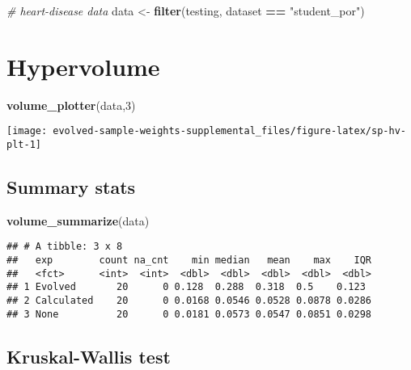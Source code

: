 \documentclass[
]{book}
\newenvironment{Shaded}{\begin{snugshade}}{\end{snugshade}}
\newcommand{\CommentTok}[1]{\textcolor[rgb]{0.56,0.35,0.01}{\textit{#1}}}
\newcommand{\DecValTok}[1]{\textcolor[rgb]{0.00,0.00,0.81}{#1}}
\newcommand{\FunctionTok}[1]{\textcolor[rgb]{0.13,0.29,0.53}{\textbf{#1}}}
\newcommand{\NormalTok}[1]{#1}
\newcommand{\OtherTok}[1]{\textcolor[rgb]{0.56,0.35,0.01}{#1}}
\newcommand{\SpecialCharTok}[1]{\textcolor[rgb]{0.81,0.36,0.00}{\textbf{#1}}}
\newcommand{\StringTok}[1]{\textcolor[rgb]{0.31,0.60,0.02}{#1}}
\begin{document}
\begin{Shaded}
\begin{Highlighting}[]
\CommentTok{\# heart{-}disease data}
\NormalTok{data }\OtherTok{\textless{}{-}} \FunctionTok{filter}\NormalTok{(testing, dataset }\SpecialCharTok{==} \StringTok{"student\_por"}\NormalTok{)}
\end{Highlighting}
\end{Shaded}

\hypertarget{hypervolume-2}{%
\section{Hypervolume}\label{hypervolume-2}}

\begin{Shaded}
\begin{Highlighting}[]
\FunctionTok{volume\_plotter}\NormalTok{(data,}\DecValTok{3}\NormalTok{)}
\end{Highlighting}
\end{Shaded}

\texttt{[image: evolved-sample-weights-supplemental\_files/figure-latex/sp-hv-plt-1]}

\hypertarget{summary-stats-2}{%
\subsection{Summary stats}\label{summary-stats-2}}

\begin{Shaded}
\begin{Highlighting}[]
\FunctionTok{volume\_summarize}\NormalTok{(data)}
\end{Highlighting}
\end{Shaded}

\begin{verbatim}
## # A tibble: 3 x 8
##   exp        count na_cnt    min median   mean    max    IQR
##   <fct>      <int>  <int>  <dbl>  <dbl>  <dbl>  <dbl>  <dbl>
## 1 Evolved       20      0 0.128  0.288  0.318  0.5    0.123 
## 2 Calculated    20      0 0.0168 0.0546 0.0528 0.0878 0.0286
## 3 None          20      0 0.0181 0.0573 0.0547 0.0851 0.0298
\end{verbatim}

\hypertarget{kruskal-wallis-test-2}{%
\subsection{Kruskal-Wallis test}\label{kruskal-wallis-test-2}}
\end{document}
